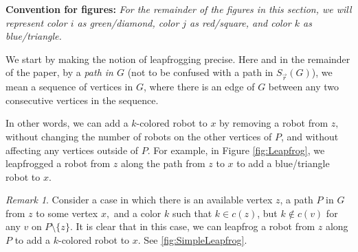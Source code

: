 \documentclass{amsart}
\newcommand{\Sr}{S_{\vec{r}}}
\theoremstyle{definition}
\newtheorem{defn}[thm]{Definition}
\theoremstyle{remark}
\newtheorem*{rmk}{Remark}
\begin{document}
\textbf{Convention for figures:} \textit{For the remainder of the figures in this section, we will represent color $i$ as green/diamond, color $j$ as red/square, and color $k$ as blue/triangle.}

We start by making the notion of leapfrogging precise. Here and in the remainder of the paper, by a \textit{path in $G$} (not to be confused with a path in $\Sr(G)$), we mean a sequence of vertices in $G$, where there is an edge of $G$ between any two consecutive vertices in the sequence. 


In other words, we can add a $k$-colored robot to $x$ by removing a robot from $z,$ without changing the number of robots on the other vertices of $P$, and without affecting any vertices outside of $P$. For example, in Figure \ref{fig:Leapfrog}, we leapfrogged a robot from $z$ along the path from $z$ to $x$ to add a blue/triangle robot to $x.$

\begin{rmk}
    Consider a case in which there is an available vertex $z$, a path $P$ in $G$ from $z$ to some vertex $x,$ and a color $k$ such that $k\in c(z)$, but $k\notin c(v)$ for any $v$ on $P\setminus\{z\}$. It is clear that in this case, we can leapfrog a robot from $z$ along $P$ to add a $k$-colored robot to $x.$ See \cref{fig:SimpleLeapfrog}.
\end{rmk}
\end{document}

